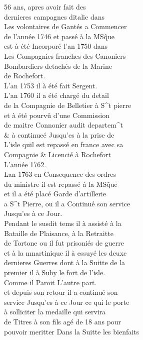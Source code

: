 \documentclass{article}
\begin{document}
\begin{pages}
56 ans, apres avoir fait des\\
dernieres campagnes ditalie dans\\
Les volontaires de Gantés a Commencer\\
de l'année 1746 et passé à la MSq̃ue\\
est à été Incorporé l'an 1750 dans\\
Les Compagnies franches des Canoniers\\
Bombardiers detachés de la Marine\\
de Rochefort.\\
L'an 1753 il à été fait Sergent.\\
L'an 1760 il a été chargé du detail\\
de la Compagnie de Belletier à S\^{}t pierre\\
et à été pourvû d'une Commission\\
de maitre Connonier audit departem\^{}t\\
\& à continueé Jusqu'es à la prise de\\
L'isle quil est repassé en france avec sa\\
Compagnie \& Licencié à Rochefort\\
L'année 1762.\\
Lan 1763 en Consequence des ordres\\
du ministre il est repassé à la MSq̃ue\\
et il a été placé Garde d'artillerie\\
a S\^{}t Pierre, ou il a Continué son service\\
Jusqu'es à ce Jour.
\pend\pstart
\\
Pendant le susdit tems il à assisté à la\\
Bataille de Plaisance, à la Retraitte\\
de Tortone ou il fut prisoniés de guerre\\
et à la mnartinique il à essuyé les deuxc\\
dernieres Guerres dont à la Suitte de la\\
premier il à Suby le fort de l'isle.\\
Comme il Paroit L'autre part.\\
et depuis son retour il a continué son\\
service Jusqu'es à ce Jour ce qui le porte\\
à solliciter la medaille qui servira\\
de Titres à son fils agé de 18 ans pour\\
pouvoir meritter Dans la Suitte les bienfaits\\

\end{pages}
\end{document}
